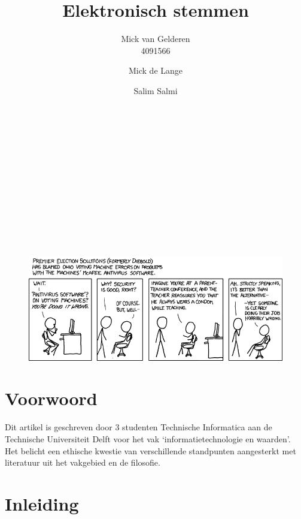 \documentclass[a4paper]{article}
\title{Elektronisch stemmen}
\author{
	Mick van Gelderen \\ 4091566 \and 
	Mick de Lange \\ \TODO{stdnr} \and
	Salim Salmi \\ \TODO{stdnr}
}
\begin{document}
\maketitle

\hfill \\ \\ \\ \\ \\ \\ \\ \\ \\ \\
\begin{figure}[htp]
	\centering
	\includegraphics[width=\textwidth]{media/voting_machines.png}
	\label{fig:voting-machines}

\end{figure}

\thispagestyle{empty}
\newpage

\section*{Voorwoord}
Dit artikel is geschreven door 3 studenten Technische Informatica aan de Technische Universiteit Delft voor het vak `informatietechnologie en waarden'. Het belicht een ethische kwestie van verschillende standpunten aangesterkt met literatuur uit het vakgebied en de filosofie. 


\thispagestyle{empty}
\newpage

\renewcommand{\contentsname}{Inhoud} 
\tableofcontents


\thispagestyle{empty}
\newpage

\section{Inleiding}
\end{document}
